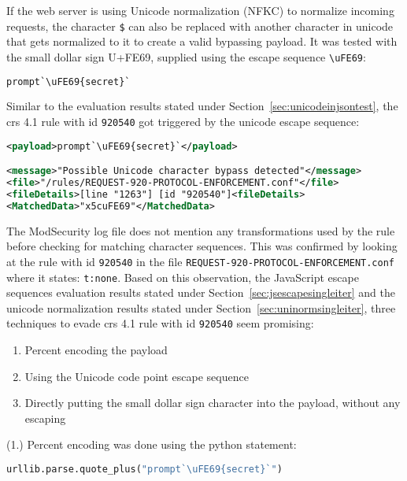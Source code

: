 If the web server is using Unicode normalization (NFKC) to normalize incoming requests, the character \verb|$| can also be replaced with another character in unicode that gets normalized to it to create a valid bypassing payload. It was tested with the small dollar sign U+FE69, supplied using the escape sequence \verb|\uFE69|:

\begin{lstlisting}[style=basicStyle, language=Python]
prompt`\uFE69{secret}`
\end{lstlisting}

Similar to the evaluation results stated under Section~\ref{sec:unicodeinjsontest}, the \acrshort{crs} 4.1 rule with id \verb|920540| got triggered by the unicode escape sequence:

\begin{lstlisting}[style=ruleStyle, language=XML]
<payload>prompt`\uFE69{secret}`</payload>

<message>"Possible Unicode character bypass detected"</message>
<file>"/rules/REQUEST-920-PROTOCOL-ENFORCEMENT.conf"</file>
<fileDetails>[line "1263"] [id "920540"]<fileDetails>
<MatchedData>"x5cuFE69"</MatchedData>
\end{lstlisting}

The ModSecurity log file does not mention any transformations used by the rule before checking for matching character sequences. This was confirmed by looking at the rule with id \verb|920540| in the file \verb|REQUEST-920-PROTOCOL-ENFORCEMENT.conf| where it states: \verb|t:none|. Based on this observation, the JavaScript escape sequences evaluation results stated under Section~\ref{sec:jsescapesingleiter} and the unicode normalization results stated under Section~\ref{sec:uninormsingleiter}, three techniques to evade \acrshort{crs} 4.1 rule with id \verb|920540| seem promising:

\begin{enumerate}
	\item Percent encoding the payload
	\item Using the Unicode code point escape sequence
	\item Directly putting the small dollar sign character into the payload, without any escaping
\end{enumerate}

(1.) Percent encoding was done using the python statement:

\begin{lstlisting}[style=basicStyle, language=Python]
urllib.parse.quote_plus("prompt`\uFE69{secret}`")
\end{lstlisting}

